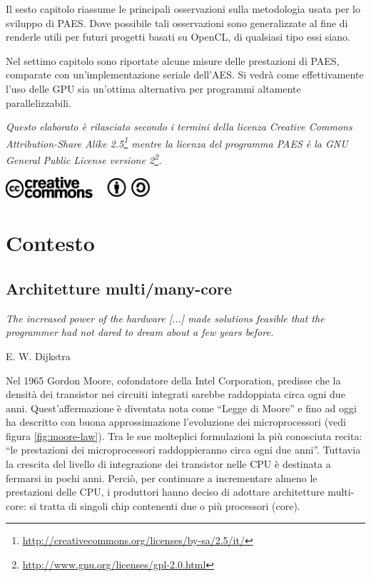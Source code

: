 \documentclass[12pt,a4paper,oneside]{book}
\begin{document}
Il sesto capitolo riassume le principali osservazioni sulla metodologia usata per lo sviluppo di PAES. Dove possibile tali osservazioni sono generalizzate al fine di renderle utili per futuri progetti basati su \ac{OpenCL}, di qualsiasi tipo essi siano.

Nel settimo capitolo sono riportate alcune misure delle prestazioni di PAES, comparate con un'implementazione seriale dell'\ac{AES}. Si vedrà come effettivamente l'uso delle \ac{GPU} sia un'ottima alternativa per programmi altamente parallelizzabili.

\vspace{1cm}
\textit{Questo elaborato è rilasciato secondo i termini della licenza Creative Commons Attribution-Share Alike 2.5\footnote{\url{http://creativecommons.org/licenses/by-sa/2.5/it/}} mentre la licenza del programma PAES è la GNU General Public License versione 2\footnote{\url{http://www.gnu.org/licenses/gpl-2.0.html}}.}
\vspace{0.1cm}
\begin{center}
\includegraphics[width=0.4\textwidth]{img/CC}
\end{center}

\mainmatter
\part{Contesto}

\chapter{Architetture multi/many-core}
\label{cha:context}
\linespread{1}
\epigraph{\textit{The increased power of the hardware [...] made solutions feasible that the programmer had not dared to dream about a few years before.}}{E. W. Dijkstra}
\linespread{1.3}

Nel 1965 Gordon Moore, cofondatore della Intel Corporation, predisse che la densità dei transistor nei circuiti integrati sarebbe raddoppiata circa ogni due anni\cite{bib:moore}. Quest'affermazione è diventata nota come ``Legge di Moore'' e fino ad oggi ha descritto con buona approssimazione l'evoluzione dei microprocessori (vedi figura \ref{fig:moore-law}). Tra le sue molteplici formulazioni la più conosciuta recita: ``le prestazioni dei microprocessori raddoppieranno circa ogni due anni''. Tuttavia la crescita del livello di integrazione dei transistor nelle \ac{CPU} è destinata a fermarsi in pochi anni. Perciò, per continuare a incrementare almeno le prestazioni delle \ac{CPU}, i produttori hanno deciso di adottare architetture multi-core: si tratta di singoli chip contenenti due o più processori (core).
\end{document}
